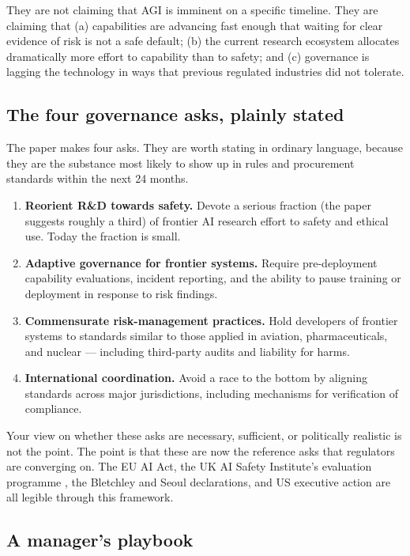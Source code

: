 \documentclass[11pt,a4paper]{article}
\begin{document}
They are not claiming that AGI is imminent on a specific timeline.
They are claiming that (a) capabilities are advancing fast enough that
waiting for clear evidence of risk is not a safe default; (b) the
current research ecosystem allocates dramatically more effort to
capability than to safety; and (c) governance is lagging the
technology in ways that previous regulated industries did not tolerate.

\subsection{The four governance asks, plainly stated}

The paper makes four asks. They are worth stating in ordinary
language, because they are the substance most likely to show up in
rules and procurement standards within the next 24 months.

\begin{enumerate}[leftmargin=1.4em]
  \item \textbf{Reorient R\&D towards safety.} Devote a serious
        fraction (the paper suggests roughly a third) of frontier AI
        research effort to safety and ethical use. Today the fraction
        is small.
  \item \textbf{Adaptive governance for frontier systems.} Require
        pre-deployment capability evaluations, incident reporting, and
        the ability to pause training or deployment in response to
        risk findings.
  \item \textbf{Commensurate risk-management practices.} Hold
        developers of frontier systems to standards similar to those
        applied in aviation, pharmaceuticals, and nuclear --- including
        third-party audits and liability for harms.
  \item \textbf{International coordination.} Avoid a race to the
        bottom by aligning standards across major jurisdictions,
        including mechanisms for verification of compliance.
\end{enumerate}

Your view on whether these asks are necessary, sufficient, or
politically realistic is not the point. The point is that these are
now the reference asks that regulators are converging on. The EU AI
Act, the UK AI Safety Institute's evaluation programme
\citep{aisiuk2024}, the Bletchley and Seoul declarations, and US
executive action are all legible through this framework.

\subsection{A manager's playbook}
\end{document}
